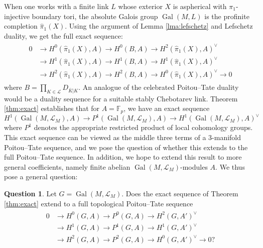 \documentclass{amsart}
\theoremstyle{plain}
\theoremstyle{definition}
\theoremstyle{plain}
\theoremstyle{plain}
\theoremstyle{plain}
\theoremstyle{remark}
\theoremstyle{remark}
\theoremstyle{plain}
\theoremstyle{definition}
\newtheorem{question}[theorem]{Question}
\theoremstyle{plain}
\DeclareMathOperator{\Gal}{\mathrm{Gal}}
\theoremstyle{plain}
\theoremstyle{plain}
\numberwithin{equation}{section}
\begin{document}
When one works with a finite link $L$ whose exterior $X$ is aspherical with $\pi_1$-injective boundary tori, the absolute Galois group $\Gal(M, L)$ is the profinite completion $\widehat{\pi}_1(X)$. Using the argument of Lemma \ref{lma:lefschetz} and Lefschetz duality, we get the full exact sequence:
\begin{align}
\begin{split}
    0 &\to H^0(\widehat{\pi}_1(X), A) \to H^0\left(B, A\right) \to H^2(\widehat{\pi}_1(X), A)^\vee \\ &\to H^1(\widehat{\pi}_1(X), A) \to H^1\left(B, A\right) \to H^1(\widehat{\pi}_1(X), A)^\vee \\\ &\to H^2(\widehat{\pi}_1(X), A) \to H^2\left(B, A\right) \to H^0(\widehat{\pi}_1(X), A)^\vee \to 0
\end{split}
\end{align}
where $B = \prod_{K \in \mathcal L}D_{\overline K|K}$. An analogue of the celebrated Poitou--Tate duality would be a duality sequence for a suitable stably Chebotarev link. Theorem \ref{thm:exact} establishes that for $A = \mathbb F_p$, we have an exact sequence
\begin{equation}
    H^1(\Gal(M, \mathcal{L}_M), A) \to P^1(\Gal(M, \mathcal{L}_M), A) \to H^1(\Gal(M, \mathcal{L}_M), A)^\vee
\end{equation}
where $P^1$ denotes the appropriate restricted product of local cohomology groups. This exact sequence can be viewed as the middle three terms of a 3-manifold Poitou--Tate sequence, and we pose the question of whether this extends to the full Poitou--Tate sequence. In addition, we hope to extend this result to more general coefficients, namely finite abelian $\Gal(M, \mathcal{L}_M)$-modules $A$. We thus pose a general question:

\begin{question}\label{q:poitoutate}
Let $G = \Gal(M, \mathcal{L}_M)$. Does the exact sequence of Theorem \ref{thm:exact} extend to a full topological Poitou--Tate sequence
\begin{align}
\begin{split}
    0 &\to H^0(G, A) \to P^0(G, A) \to H^2(G, A')^\vee \\ &\to H^1(G, A) \to P^1(G, A) \to H^1(G, A')^\vee \\ &\to H^2(G, A) \to P^2(G, A) \to H^0(G, A')^\vee \to 0?
\end{split}
\end{align}
\end{question}
\end{document}
